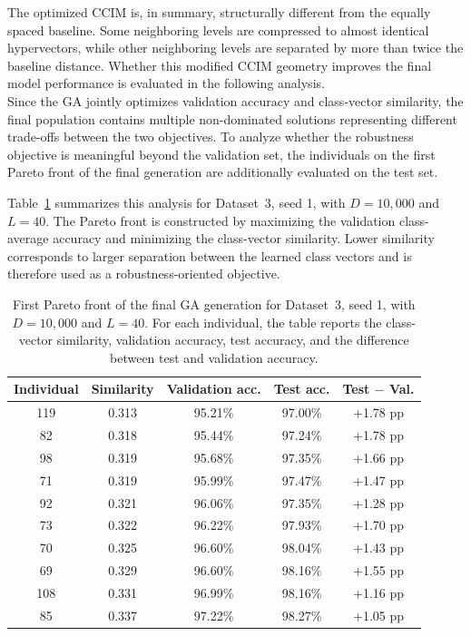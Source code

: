 The optimized CCIM is, in summary, structurally different from the equally spaced baseline. Some neighboring levels are compressed to almost identical hypervectors, while other neighboring levels are separated by more than twice the baseline distance. Whether this modified CCIM geometry improves the final model performance is evaluated in the following analysis.\\

Since the \ac{GA} jointly optimizes validation accuracy and class-vector similarity, the final population contains multiple non-dominated solutions representing different trade-offs between the two objectives. To analyze whether the robustness objective is meaningful beyond the validation set, the individuals on the first Pareto front of the final generation are additionally evaluated on the test set.

Table~\ref{tab:ga_pareto_front} summarizes this analysis for Dataset~3, seed 1, with $D=10{,}000$ and $L=40$. The Pareto front is constructed by maximizing the validation class-average accuracy and minimizing the class-vector similarity. Lower similarity corresponds to larger separation between the learned class vectors and is therefore used as a robustness-oriented objective.

\begin{table}[htbp]
    \centering
    \small
    \setlength{\tabcolsep}{4pt}
    \caption{First Pareto front of the final GA generation for Dataset~3, seed 1, with $D=10{,}000$ and $L=40$. For each individual, the table reports the class-vector similarity, validation accuracy, test accuracy, and the difference between test and validation accuracy.}
    \label{tab:ga_pareto_front}
    \begin{tabular}{c c c c c}
        \toprule
        \textbf{Individual} 
        & \textbf{Similarity} 
        & \textbf{Validation acc.} 
        & \textbf{Test acc.} 
        & \textbf{Test $-$ Val.} \\
        \midrule
        119 & 0.313 & 95.21\% & 97.00\% & +1.78 pp \\
        82  & 0.318 & 95.44\% & 97.24\% & +1.78 pp \\
        98  & 0.319 & 95.68\% & 97.35\% & +1.66 pp \\
        71  & 0.319 & 95.99\% & 97.47\% & +1.47 pp \\
        92  & 0.321 & 96.06\% & 97.35\% & +1.28 pp \\
        73  & 0.322 & 96.22\% & 97.93\% & +1.70 pp \\
        70  & 0.325 & 96.60\% & 98.04\% & +1.43 pp \\
        69  & 0.329 & 96.60\% & 98.16\% & +1.55 pp \\
        108 & 0.331 & 96.99\% & 98.16\% & +1.16 pp \\
        85  & 0.337 & 97.22\% & 98.27\% & +1.05 pp \\
        \bottomrule
    \end{tabular}
\end{table}

